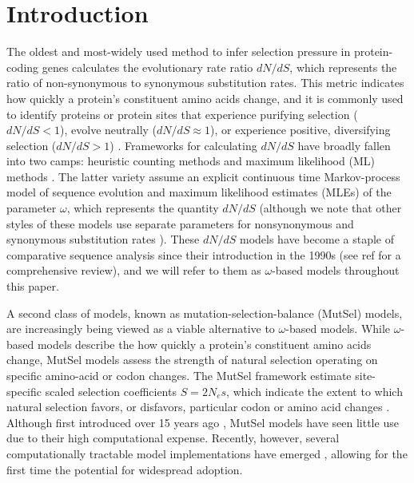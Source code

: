 \documentclass[11pt]{article}
\begin{document}
		
\section*{Introduction}
		
The oldest and most-widely used method to infer selection pressure in protein-coding genes calculates the evolutionary rate ratio $dN/dS$, which represents the ratio of non-synonymous to synonymous substitution rates. This metric indicates how quickly a protein's constituent amino acids change, and it is commonly used to identify proteins or protein sites that experience purifying selection ($dN/dS<1$), evolve neutrally ($dN/dS\approx1$), or experience positive, diversifying selection ($dN/dS>1$) \cite{NielsenYang1998, Yangetal2000, KosakovskyPondFrost2005b, Huelsenbecketal2006}. Frameworks for calculating $dN/dS$ have broadly fallen into two camps: heuristic counting methods \cite{LWL85,NG86,Pamilo1993,Ina1995,YN00} and maximum likelihood (ML) methods \cite{GoldmanYang1994,MuseGaut1994,NielsenYang1998,Yang2006}. The latter variety assume an explicit continuous time Markov-process model of sequence evolution and maximum likelihood estimates (MLEs) of the parameter $\omega$, which represents the quantity $dN/dS$ (although we note that other styles of these models use separate parameters for nonsynonymous and synonymous substitution rates \cite{MuseGaut1994,KosakovskyPondMuse2005}). These $dN/dS$ models have become a staple of comparative sequence analysis since their introduction in the 1990s (see ref \cite{Anisimova2009} for a comprehensive review), and we will refer to them as $\omega$-based models throughout this paper.

A second class of models, known as mutation-selection-balance (MutSel) models, are increasingly being viewed as a viable alternative to $\omega$-based models. While $\omega$-based models describe the how quickly a protein's constituent amino acids change, MutSel models assess the strength of natural selection operating on specific amino-acid or codon changes. The MutSel framework estimate site-specific scaled selection coefficients $S=2N_es$, which indicate the extent to which natural selection favors, or disfavors, particular codon or amino acid changes \cite{HalpernBruno1998,YangNielsen2008,Rodrigueetal2010,Tamurietal2012}. Although first introduced over 15 years ago \cite{HalpernBruno1998}, MutSel models have seen little use due to their high computational expense. Recently, however, several computationally tractable model implementations have emerged \cite{RodrigueLartillot2014,Tamurietal2014}, allowing for the first time the potential for widespread adoption.		
		
\end{document}
